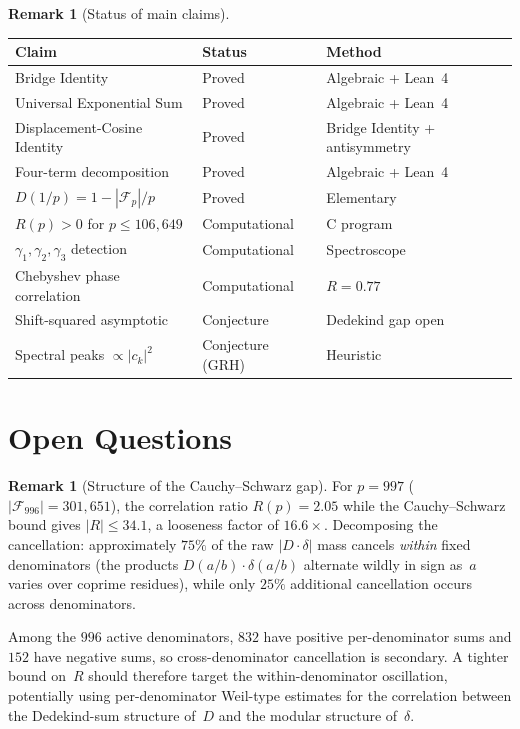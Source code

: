 \documentclass[11pt]{article}
\theoremstyle{definition}
\newtheorem{remark}[theorem]{Remark}
\newcommand{\F}{\mathcal{F}}
\begin{document}
\begin{remark}[Status of main claims]
\begin{center}
\begin{tabular}{lll}
\toprule
Claim & Status & Method \\
\midrule
Bridge Identity & Proved & Algebraic + Lean~4 \\
Universal Exponential Sum & Proved & Algebraic + Lean~4 \\
Displacement-Cosine Identity & Proved & Bridge Identity + antisymmetry \\
Four-term decomposition & Proved & Algebraic + Lean~4 \\
$D(1/p) = 1 - |\F_p|/p$ & Proved & Elementary \\
$R(p) > 0$ for $p \le 106{,}649$ & Computational & C program \\
$\gamma_1,\gamma_2,\gamma_3$ detection & Computational & Spectroscope \\
Chebyshev phase correlation & Computational & $R = 0.77$ \\
Shift-squared asymptotic & Conjecture & Dedekind gap open \\
Spectral peaks $\propto |c_k|^2$ & Conjecture (GRH) & Heuristic \\
\bottomrule
\end{tabular}
\end{center}
\end{remark}

\section{Open Questions}\label{sec:open}

\begin{remark}[Structure of the Cauchy--Schwarz gap]\label{rem:cs-gap}
For $p = 997$ ($|\F_{996}| = 301{,}651$), the correlation ratio
$R(p) = 2.05$ while the Cauchy--Schwarz bound gives
$|R| \le 34.1$, a looseness factor of $16.6\times$.
Decomposing the cancellation:
approximately $75\%$ of the raw $|D\cdot\delta|$ mass
cancels \emph{within} fixed denominators (the products
$D(a/b)\cdot\delta(a/b)$ alternate wildly in sign as~$a$
varies over coprime residues), while only $25\%$ additional
cancellation occurs across denominators.

Among the $996$ active denominators, $832$ have positive
per-denominator sums and $152$ have negative sums,
so cross-denominator cancellation is secondary.
A tighter bound on~$R$ should therefore target the
within-denominator oscillation, potentially using
per-denominator Weil-type estimates for the correlation
between the Dedekind-sum structure of~$D$ and the
modular structure of~$\delta$.
\end{remark}
\end{document}
